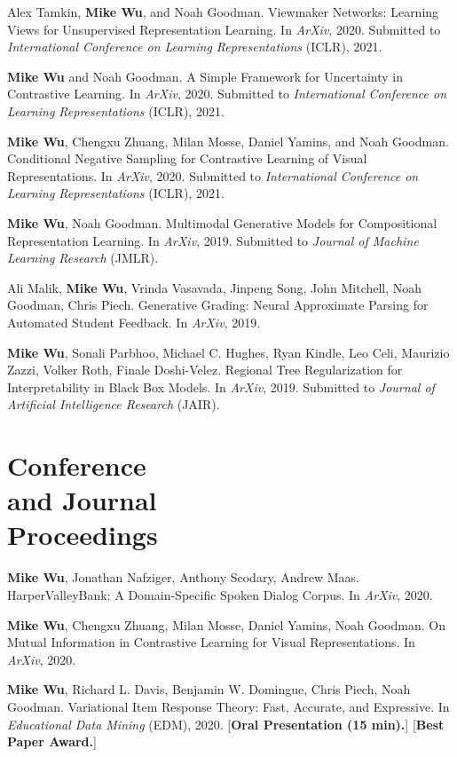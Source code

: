 \documentclass[margin, 10pt]{res} %
\begin{document}
\begin{resume}
Alex Tamkin, \textbf{Mike Wu}, and Noah Goodman. Viewmaker Networks: Learning Views for Unsupervised Representation Learning. In \textit{ArXiv}, 2020. Submitted to \textit{International Conference on Learning Representations} (ICLR), 2021.

\textbf{Mike Wu} and Noah Goodman. A Simple Framework for Uncertainty in Contrastive Learning. In \textit{ArXiv}, 2020. Submitted to \textit{International Conference on Learning Representations} (ICLR), 2021.

\textbf{Mike Wu}, Chengxu Zhuang, Milan Mosse, Daniel Yamins, and Noah Goodman. Conditional Negative Sampling for Contrastive Learning of Visual Representations. In \textit{ArXiv}, 2020. Submitted to \textit{International Conference on Learning Representations} (ICLR), 2021.

\textbf{Mike Wu}, Noah Goodman. Multimodal Generative Models for Compositional Representation Learning. In \textit{ArXiv}, 2019. Submitted to \textit{Journal of Machine Learning Research} (JMLR).

Ali Malik, \textbf{Mike Wu}, Vrinda Vasavada, Jinpeng Song, John Mitchell, Noah Goodman, Chris Piech. Generative Grading: Neural Approximate Parsing for Automated Student Feedback. In \textit{ArXiv}, 2019.

\textbf{Mike Wu}, Sonali Parbhoo, Michael C. Hughes, Ryan Kindle, Leo Celi, Maurizio Zazzi, Volker Roth, Finale Doshi-Velez. Regional Tree Regularization for Interpretability in Black Box Models. In \textit{ArXiv}, 2019. Submitted to \textit{Journal of Artificial Intelligence Research} (JAIR).

\section{Conference \\and Journal \\Proceedings}

\textbf{Mike Wu}, Jonathan Nafziger, Anthony Scodary, Andrew Maas. HarperValleyBank: A Domain-Specific Spoken Dialog Corpus. In \textit{ArXiv}, 2020.

\textbf{Mike Wu}, Chengxu Zhuang, Milan Mosse, Daniel Yamins, Noah Goodman. On Mutual Information in Contrastive Learning for Visual Representations. In \textit{ArXiv}, 2020.

\textbf{Mike Wu}, Richard L. Davis, Benjamin W. Domingue, Chris Piech, Noah Goodman. Variational Item Response Theory: Fast, Accurate, and Expressive. In \textit{Educational Data Mining} (EDM), 2020. [\textbf{Oral Presentation (15 min).}] [\textbf{Best Paper Award.}]


\end{resume}
\end{document}
